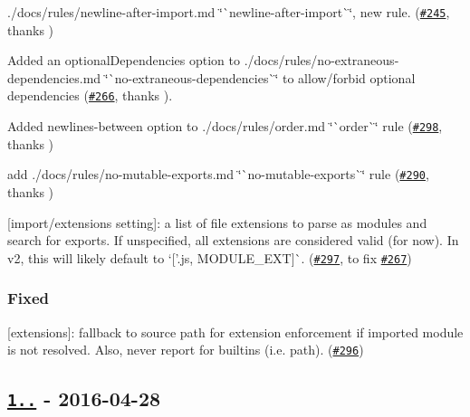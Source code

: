 \begin{DoxyItemize}
\item ./docs/rules/newline-\/after-\/import.md \char`\"{}\`{}newline-\/after-\/import\`{}\char`\"{}, new rule. (\href{https://github.com/benmosher/eslint-plugin-import/pull/245}{\tt \#245}, thanks \href{https://github.com/singles}{\tt })
\item Added an {\ttfamily optional\+Dependencies} option to ./docs/rules/no-\/extraneous-\/dependencies.md \char`\"{}\`{}no-\/extraneous-\/dependencies\`{}\char`\"{} to allow/forbid optional dependencies (\href{https://github.com/benmosher/eslint-plugin-import/issues/266}{\tt \#266}, thanks \href{https://github.com/jfmengels}{\tt }).
\item Added {\ttfamily newlines-\/between} option to ./docs/rules/order.md \char`\"{}\`{}order\`{}\char`\"{} rule (\href{https://github.com/benmosher/eslint-plugin-import/pull/298}{\tt \#298}, thanks \href{https://github.com/singles}{\tt })
\item add ./docs/rules/no-\/mutable-\/exports.md \char`\"{}\`{}no-\/mutable-\/exports\`{}\char`\"{} rule (\href{https://github.com/benmosher/eslint-plugin-import/pull/290}{\tt \#290}, thanks \href{https://github.com/josh}{\tt })
\item \mbox{[}{\ttfamily import/extensions} setting\mbox{]}\+: a list of file extensions to parse as modules and search for {\ttfamily export}s. If unspecified, all extensions are considered valid (for now). In v2, this will likely default to `\mbox{[}'.js\textquotesingle{}, M\+O\+D\+U\+L\+E\+\_\+\+E\+XT\mbox{]}\`{}. (\href{https://github.com/benmosher/eslint-plugin-import/pull/297}{\tt \#297}, to fix \href{https://github.com/benmosher/eslint-plugin-import/issues/267}{\tt \#267})
\end{DoxyItemize}

\subsubsection*{Fixed}


\begin{DoxyItemize}
\item \mbox{[}{\ttfamily extensions}\mbox{]}\+: fallback to source path for extension enforcement if imported module is not resolved. Also, never report for builtins (i.\+e. {\ttfamily path}). (\href{https://github.com/benmosher/eslint-plugin-import/pull/296}{\tt \#296})
\end{DoxyItemize}

\subsection*{\href{https://github.com/benmosher/eslint-plugin-import/compare/v1.6.0...v1.6.1}{\tt 1..} -\/ 2016-\/04-\/28}

